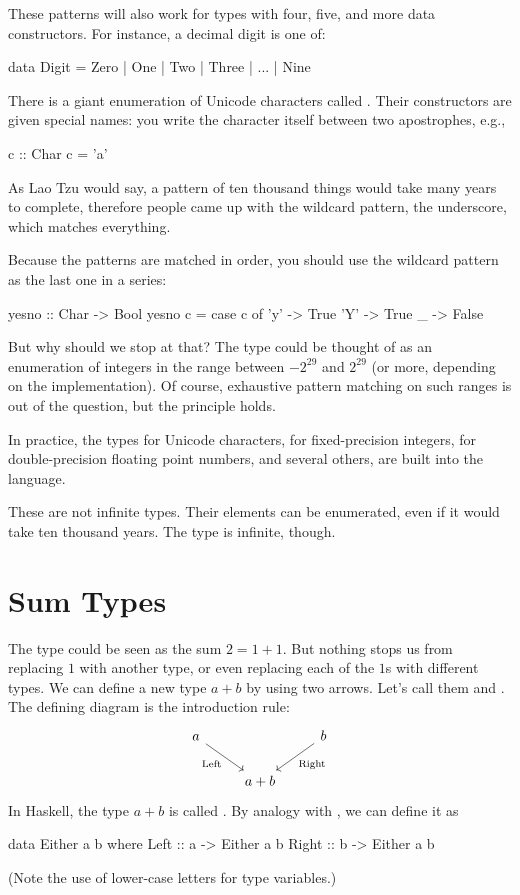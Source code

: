 \documentclass[DaoFP]{subfiles}
\begin{document}
These patterns will also work for types with four, five, and more data constructors. For instance, a decimal digit is one of:
\begin{haskell}
data Digit = Zero | One | Two | Three | ... | Nine
\end{haskell}

There is a giant enumeration of Unicode characters called . Their constructors are given special names: you write the character itself between two apostrophes, e.g.,
\begin{haskell}
c :: Char
c = 'a'
\end{haskell}

As Lao Tzu would say, a pattern of ten thousand things would take many years to complete, therefore people came up with the wildcard pattern, the underscore, which matches everything. 

Because the patterns are matched in order, you should use the wildcard pattern as the last one in a series:
\begin{haskell}
yesno :: Char -> Bool
yesno c = case c of
  'y' -> True
  'Y' -> True
  _   -> False
\end{haskell}

But why should we stop at that? The type  could be thought of as an enumeration of integers in the range between $-2^{29}$ and $2^{29}$ (or more, depending on the implementation). Of course, exhaustive pattern matching on such ranges is out of the question, but the principle holds. 

In practice, the types  for Unicode characters,  for fixed-precision integers,  for double-precision floating point numbers, and several others, are built into the language.

These are not infinite types. Their elements can be enumerated, even if it would take ten thousand years. The type  is infinite, though.


\section{Sum Types}

The  type could be seen as the sum $2 = 1 + 1$. But nothing stops us from replacing $1$ with another type, or even replacing each of the $1$s with different types. We can define a new type $a + b$ by using two arrows. Let's call them  and . The defining diagram is the introduction rule:
\[
 \begin{tikzcd}
 a
 \arrow[dr,  "\text{Left}"']
 && b
 \arrow[dl, "\text{Right}"]
 \\
&a + b
 \end{tikzcd}
\]
In Haskell, the type $a + b$ is called . By analogy with , we can define it as
\begin{haskell}
data Either a b where
  Left  :: a -> Either a b
  Right :: b -> Either a b
\end{haskell}
 (Note the use of lower-case letters for type variables.)
 
\end{document}
